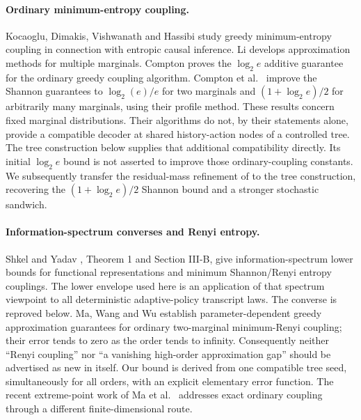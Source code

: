 \documentclass[11pt,a4paper]{article}
\begin{document}
\paragraph{Ordinary minimum-entropy coupling.}
Kocaoglu, Dimakis, Vishwanath and Hassibi \cite{KDVH17} study greedy
minimum-entropy coupling in connection with entropic causal inference.
Li \cite{Li21} develops approximation methods for multiple marginals.
Compton \cite{C22} proves the $\log_2e$ additive guarantee for the ordinary
greedy coupling algorithm. Compton et al.\ \cite{CKQGK23} improve the
Shannon guarantees to $\log_2(e)/e$ for two marginals and
$(1+\log_2e)/2$ for arbitrarily many marginals, using their profile method.
These results concern fixed marginal distributions. Their algorithms do
not, by their statements alone, provide a compatible decoder at shared
history-action nodes of a controlled tree. The tree construction below
supplies that additional compatibility directly. Its initial $\log_2e$ bound is not asserted to improve those
ordinary-coupling constants. We subsequently transfer the residual-mass
refinement of \cite{CKQGK23} to the tree construction, recovering the
$(1+\log_2e)/2$ Shannon bound and a stronger stochastic sandwich.

\paragraph{Information-spectrum converses and Renyi entropy.}
Shkel and Yadav \cite{SY23}, Theorem 1 and Section III-B, give
information-spectrum lower bounds for functional representations and
minimum Shannon/Renyi entropy couplings. The lower envelope used here
is an application of that spectrum viewpoint to all deterministic
adaptive-policy transcript laws. The converse is reproved below.
Ma, Wang and Wu \cite{MWW25} establish parameter-dependent greedy
approximation guarantees for ordinary two-marginal minimum-Renyi
coupling; their error tends to zero as the order tends to infinity.
Consequently neither ``Renyi coupling'' nor ``a vanishing high-order
approximation gap'' should be advertised as new in itself.
Our bound is derived from one compatible tree seed, simultaneously for
all orders, with an explicit elementary error function.
The recent extreme-point work of Ma et al.\ \cite{MWWC25} addresses exact
ordinary coupling through a different finite-dimensional route.
\end{document}
